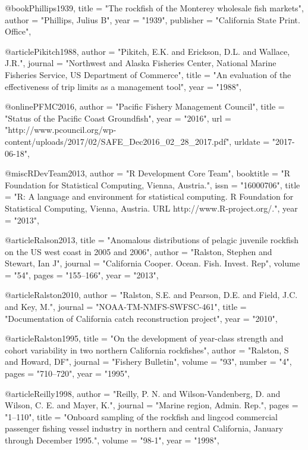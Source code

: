 @book{Phillips1939,
    title = "{The rockfish of the Monterey wholesale fish markets}",
    author = "{Phillips, Julius B}",
    year = "{1939}",
    publisher = "{California State Print. Office}",
}

@article{Pikitch1988,
    author = "{Pikitch, E.K. and Erickson, D.L. and Wallace, J.R.}",
    journal = "{Northwest and Alaska Fisheries Center, National Marine Fisheries Service, US Department of Commerce}",
    title = "{{An evaluation of the effectiveness of trip limits as a management tool}}",
    year = "{1988}",
}

@online{PFMC2016,
    author = "{Pacific Fishery Management Council}",
    title = "{{Status of the Pacific Coast Groundfish\nFishery}}",
    year = "2016",
    url = "{http://www.pcouncil.org/wp-content/uploads/2017/02/SAFE_Dec2016_02_28_2017.pdf}",
    urldate = "{2017-06-18}",
}

@misc{RDevTeam2013, 
    author = "{{R Development Core Team}}",
    booktitle = "{R Foundation for Statistical Computing, Vienna, Austria.}",
    issn = "{16000706}",
    title = "{{R: A language and environment for statistical computing. R Foundation for Statistical Computing, Vienna, Austria. URL http://www.R-project.org/.}}",
    year = "{2013}",
}

@article{Ralson2013,
    title = "{Anomalous distributions of pelagic juvenile rockfish on the US west coast in 2005 and 2006}",
    author = "{Ralston, Stephen and Stewart, Ian J}",
    journal = "{California Cooper. Ocean. Fish. Invest. Rep}",
    volume = "{54}",
    pages = "{155--166}",
    year = "{2013}",
}

@article{Ralston2010,
    author = "{Ralston, S.E. and Pearson, D.E. and Field, J.C. and Key, M.}",
    journal = "{NOAA-TM-NMFS-SWFSC-461}",
    title = "{{Documentation of California catch reconstruction project}}",
    year = "{2010}",
}

@article{Ralston1995,
    title = "{On the development of year-class strength and cohort variability in two northern California rockfishes}",
    author = "{Ralston, S and Howard, DF}",
    journal = "{Fishery Bulletin}",
    volume = "{93}",
    number = "{4}",
    pages = "{710--720}",
    year = "{1995}",
}

@article{Reilly1998,
    author = "{Reilly, P. N. and Wilson-Vandenberg, D. and Wilson, C. E. and Mayer, K.}",
    journal = "{Marine region, Admin. Rep.}",
    pages = "{1--110}",
    title = "{{Onboard sampling of the rockfish and lingcod commercial passenger fishing vessel industry in northern and central California, January through December 1995.}}",
    volume = "{98-1}",
    year = "{1998}",
}

